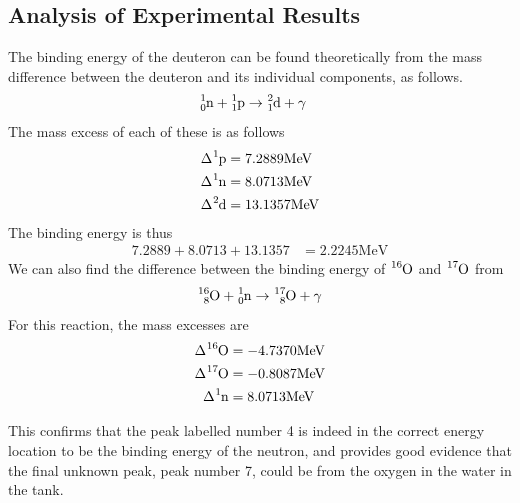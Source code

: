 \subsection{Analysis of Experimental Results} %
\label{sub:analysis_of_experimental_results}
The binding energy of the deuteron can be found theoretically from the mass difference between the deuteron and its individual components, as follows.
\begin{align}
	\ce{^1_0 n} + \ce{^1_1 p} &\rightarrow \ce{^2_1 d} + \gamma
\end{align}
The mass excess of each of these is as follows
\begin{align*}
	\Delta \ce{^1 p} &= 7.2889 \text{MeV} \\
	\Delta \ce{^1 n} &= 8.0713 \text{MeV} \\
	\Delta \ce{^2 d} &= 13.1357 \text{MeV}
\end{align*}
The binding energy is thus
\begin{align}
	7.2889 + 8.0713 + 13.1357 &= 2.2245 \text{MeV}
\end{align}
We can also find the difference between the binding energy of $\ce{^{16}O}$ and $\ce{^{17}O}$ from
\begin{align}
	\ce{^{16}_8 O} + \ce{^1_0 n} \rightarrow \ce{^{17}_8 O} + \gamma
\end{align}
For this reaction, the mass excesses are
\begin{align*}
	\Delta \ce{^{16} O} &= -4.7370 \text{MeV} \\
	\Delta \ce{^{17} O} &= -0.8087 \text{MeV} \\
	\Delta \ce{^1 n} &= 8.0713 \text{MeV} \\
\end{align*}

This confirms that the peak labelled number 4 is indeed in the correct energy location to be the binding energy of the neutron, and provides good evidence that the final unknown peak, peak number 7, could be from the oxygen in the water in the tank.


